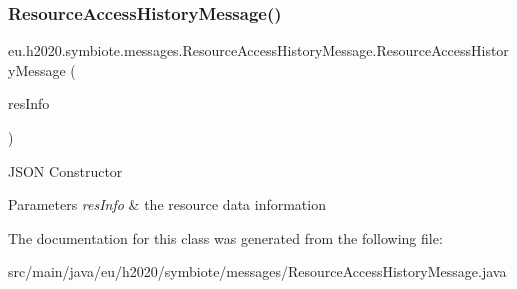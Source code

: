 \subsubsection{\texorpdfstring{Resource\+Access\+History\+Message()}{ResourceAccessHistoryMessage()}}
{\footnotesize\ttfamily eu.\+h2020.\+symbiote.\+messages.\+Resource\+Access\+History\+Message.\+Resource\+Access\+History\+Message (\begin{DoxyParamCaption}\item[{@Json\+Property(\char`\"{}resource\+Info\char`\"{}) Resource\+Info}]{res\+Info }\end{DoxyParamCaption})}

J\+S\+ON Constructor 
\begin{DoxyParams}{Parameters}
{\em res\+Info} & the resource data information \\
\hline
\end{DoxyParams}


The documentation for this class was generated from the following file\+:\begin{DoxyCompactItemize}
\item 
src/main/java/eu/h2020/symbiote/messages/Resource\+Access\+History\+Message.\+java\end{DoxyCompactItemize}
